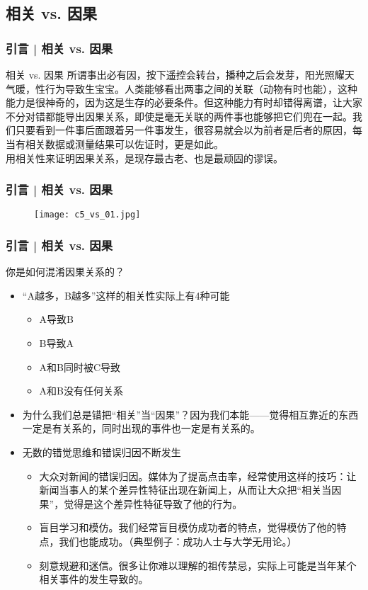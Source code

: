 \subsection{相关 vs. 因果}
\begin{frame}
  \frametitle{引言 | 相关 vs. 因果}
  \begin{block}{相关 vs. 因果}
所谓事出必有因，按下遥控会转台，播种之后会发芽，阳光照耀天气暖，性行为导致生宝宝。人类能够看出两事之间的关联（动物有时也能），这种能力是很神奇的，因为这是生存的必要条件。但这种能力有时却错得离谱，让大家不分对错都能导出因果关系，即使是毫无关联的两件事也能够把它们兜在一起。我们只要看到一件事后面跟着另一件事发生，很容易就会以为前者是后者的原因，每当有相关数据或测量结果可以佐证时，更是如此。\\
    \vspace{0.5em}
    \alert{用相关性来证明因果关系，是现存最古老、也是最顽固的谬误。}
  \end{block}
\end{frame}

\begin{frame}
  \frametitle{引言 | 相关 vs. 因果}
  \begin{figure}
    \centering
    \texttt{[image: c5\_vs\_01.jpg]}
  \end{figure}
\end{frame}

\begin{frame}
  \frametitle{引言 | 相关 vs. 因果}
  \begin{block}{你是如何混淆因果关系的？}
    \begin{itemize}
      \item “A越多，B越多”这样的相关性实际上有4种可能
        \begin{itemize}
          \item A导致B
          \item B导致A
          \item A和B同时被C导致
          \item A和B没有任何关系
        \end{itemize}
      \item 为什么我们总是错把“相关”当“因果”？因为我们本能——觉得相互靠近的东西一定是有关系的，同时出现的事件也一定是有关系的。
      \item 无数的错觉思维和错误归因不断发生
        \begin{itemize}
          \item 大众对新闻的错误归因。媒体为了提高点击率，经常使用这样的技巧：让新闻当事人的某个差异性特征出现在新闻上，从而让大众把“相关当因果”，觉得是这个差异性特征导致了他的行为。
          \item 盲目学习和模仿。我们经常盲目模仿成功者的特点，觉得模仿了他的特点，我们也能成功。（典型例子：成功人士与大学无用论。）
          \item 刻意规避和迷信。很多让你难以理解的祖传禁忌，实际上可能是当年某个相关事件的发生导致的。
        \end{itemize}
    \end{itemize}
  \end{block}
\end{frame}

